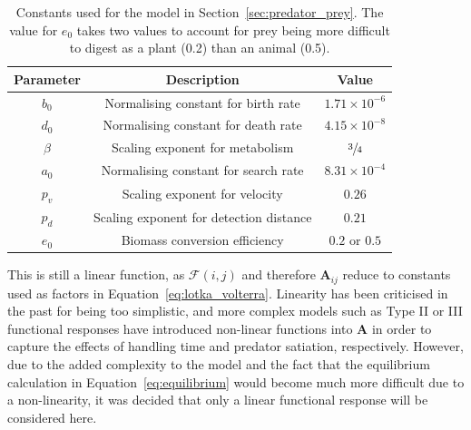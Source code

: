 \begin{table}
  \centering
  \caption[Values of constants used for the model in Section~\ref{sec:predator_prey}]{Constants used for the model in Section~\ref{sec:predator_prey}. The value for $e_0$ takes two values to account for prey being more difficult to digest as a plant (0.2) than an animal (0.5).}
  \setlength{\tabcolsep}{1em} %
  {\renewcommand{\arraystretch}{1.25}%
  \begin{tabular}{|c|c|c|}
    \hline
    Parameter & Description & Value
    \\\hline\hline
    $b_0$ & Normalising constant for birth rate & $1.71\times10^{-6}$
    \\\hline
    $d_0$ & Normalising constant for death rate & $4.15\times10^{-8}$
    \\\hline
    $\beta$ & Scaling exponent for metabolism & $\sfrac{3}{4}$
    \\\hline
    $a_0$ & Normalising constant for search rate & $8.31\times10^{-4}$
    \\\hline
    $p_v$ & Scaling exponent for velocity & $0.26$
    \\\hline
    $p_d$ & Scaling exponent for detection distance & $0.21$
    \\\hline
    $e_0$ & Biomass conversion efficiency & $0.2$ or $0.5$
    \\\hline
  \end{tabular}}
  \label{tab:lotka_volterra_constants}
\end{table}

This is still a linear function, as $\mathcal{F}(i,j)$ and therefore $\mathbf{A}_{ij}$ reduce to constants used as factors in Equation~\eqref{eq:lotka_volterra}. Linearity has been criticised in the past for being too simplistic, and more complex models such as Type II or III functional responses \cite{Holling1973} have introduced non-linear functions into $\mathbf{A}$ in order to capture the effects of handling time and predator satiation, respectively.
However, due to the added complexity to the model and the fact that the equilibrium calculation in Equation~\eqref{eq:equilibrium} would become much more difficult due to a non-linearity, it was decided that only a linear functional response will be considered here.

